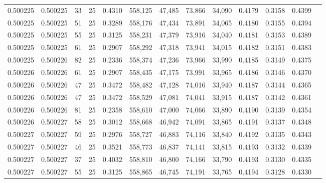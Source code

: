 \begin{tabular}{rrrrrrrrrrrrr}
0.500225 & 0.500225 &    33 &  25 &                                     0.4310 & 558,125 &  47,485 &  73,866 &  34,090 & 0.4179 & 0.3158 & 0.4399 \\
0.500225 & 0.500225 &    51 &  25 &                                     0.3289 & 558,176 &  47,434 &  73,891 &  34,065 & 0.4180 & 0.3155 & 0.4394 \\
0.500225 & 0.500225 &    55 &  25 &                                     0.3125 & 558,231 &  47,379 &  73,916 &  34,040 & 0.4181 & 0.3153 & 0.4389 \\
0.500225 & 0.500225 &    61 &  25 &                                     0.2907 & 558,292 &  47,318 &  73,941 &  34,015 & 0.4182 & 0.3151 & 0.4383 \\
0.500225 & 0.500226 &    82 &  25 &                                     0.2336 & 558,374 &  47,236 &  73,966 &  33,990 & 0.4185 & 0.3149 & 0.4375 \\
0.500226 & 0.500226 &    61 &  25 &                                     0.2907 & 558,435 &  47,175 &  73,991 &  33,965 & 0.4186 & 0.3146 & 0.4370 \\
0.500226 & 0.500226 &    47 &  25 &                                     0.3472 & 558,482 &  47,128 &  74,016 &  33,940 & 0.4187 & 0.3144 & 0.4365 \\
0.500226 & 0.500226 &    47 &  25 &                                     0.3472 & 558,529 &  47,081 &  74,041 &  33,915 & 0.4187 & 0.3142 & 0.4361 \\
0.500226 & 0.500226 &    81 &  25 &                                     0.2358 & 558,610 &  47,000 &  74,066 &  33,890 & 0.4190 & 0.3139 & 0.4354 \\
0.500226 & 0.500227 &    58 &  25 &                                     0.3012 & 558,668 &  46,942 &  74,091 &  33,865 & 0.4191 & 0.3137 & 0.4348 \\
0.500227 & 0.500227 &    59 &  25 &                                     0.2976 & 558,727 &  46,883 &  74,116 &  33,840 & 0.4192 & 0.3135 & 0.4343 \\
0.500227 & 0.500227 &    46 &  25 &                                     0.3521 & 558,773 &  46,837 &  74,141 &  33,815 & 0.4193 & 0.3132 & 0.4339 \\
0.500227 & 0.500227 &    37 &  25 &                                     0.4032 & 558,810 &  46,800 &  74,166 &  33,790 & 0.4193 & 0.3130 & 0.4335 \\
0.500227 & 0.500227 &    55 &  25 &                                     0.3125 & 558,865 &  46,745 &  74,191 &  33,765 & 0.4194 & 0.3128 & 0.4330 \\

\end{tabular}
